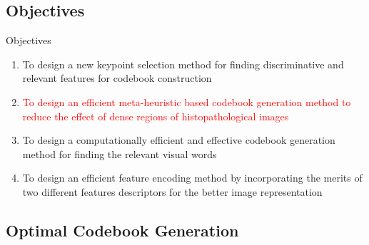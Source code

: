 \documentclass [9pt,times] {beamer}
\begin{document}

\subsection{Objectives}
\begin{frame}{Objectives}
\begin{enumerate}
	\justifying
	\item To design a new keypoint selection method for finding discriminative and relevant features for codebook construction \\[3ex]

	\item \textcolor{red}{To design an efficient meta-heuristic based codebook generation method to reduce the effect of dense regions of histopathological images }\\[3ex]
	
	\item To design a computationally efficient and effective codebook generation method for finding the relevant visual words \\[3ex]

	\item To design an efficient feature encoding method by incorporating the merits of two different features descriptors for the better image representation
	
\end{enumerate}
\end{frame}




\subsection{Optimal Codebook Generation}
\end{document}
